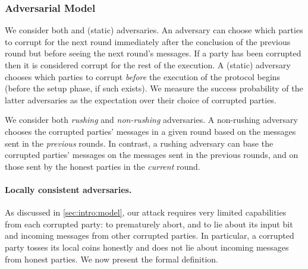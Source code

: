 \subsubsection{Adversarial Model}\label{sec:OurResults:Adv}

We consider both \adaptive and \nonadaptive (\aka static) adversaries. An \adaptive adversary can choose which parties to corrupt for the next round immediately after the conclusion of the previous round but before seeing the next round's messages. If a party has been corrupted then it is considered corrupt for the rest of the execution. A \nonadaptive (static) adversary chooses which parties to corrupt \emph{before} the execution of the protocol begins (\ie before the setup phase, if such exists). We measure the success probability of the latter adversaries as the expectation over their choice of corrupted parties.

We consider both \emph{rushing} and \emph{non-rushing} adversaries. A non-rushing adversary chooses the corrupted parties' messages in a given round based on the messages sent in the \emph{previous} rounds. In contrast, a rushing adversary can base the corrupted parties' messages on the messages sent in the previous rounds, and on those sent by the honest parties in the \emph{current} round.

\paragraph{Locally consistent adversaries.}
As discussed in \cref{sec:intro:model}, our attack requires very limited capabilities from each corrupted party: to prematurely abort, and to lie about its input bit and incoming messages from other corrupted parties. In particular, a corrupted party tosses its local coins honestly and does not lie about incoming messages from honest parties. We now present the formal definition.

